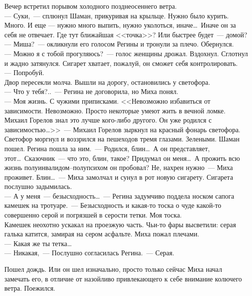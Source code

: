 \noindent Вечер встретил порывом холодного позднеосеннего ветра. \\
--- Суки,~--- сплюнул Шаман, прикуривая на крыльце. Нужно было курить. Много. И 
еще --- нужно много выпить, нужно уколоться, иначе\ldots\ Иначе он за себя не 
отвечает. Где тут ближайшая <<точка>>? Или быстрее будет~--- домой?\\
--- Миша?~--- окликнули его голосом Регины и тронули за плечо. Обернулся. \\
--- Можно я с тобой прогуляюсь?~--- голос женщины дрожал. Вздохнул. Сглотнул и 
жадно затянулся. Сигарет хватает, пожалуй, он сможет себя контролировать. \\
--- Попробуй.\\
Двор пересекли молча. Вышли на дорогу, остановились у светофора.\\
--- Что у тебя?..~--- Регина не договорила, но Миха понял.\\
--- Моя жизнь. С чужими приписками. <<Невозможно избавиться от зависимости. 
Невозможно. Просто некоторые умеют жить в вечной ломке. Михаил Горелов знал это 
лучше кого-либо другого. Он уже родился с зависимостью\ldots>>~--- Михаил 
Горелов зыркнул на красный фонарь светофора. Светофор моргнул и воззрился на пешеходов 
тремя глазами. Зелеными. Шаман пошел. Регина пошла за ним.~--- Родился, 
блин\ldots\ А он представляет, этот\ldots\ Сказочник~--- что это, блин, такое? Придумал он 
меня\ldots\ А прожить всю жизнь полуинвалидом--полупсихом он пробовал? Не, нахрен нужно~--- 
Миха проживет. Блин\ldots~--- Миха замолчал и сунул в рот новую сигарету. Сигарета 
послушно задымилась.\\
--- А у меня~--- безысходность\ldots~--- Регина задумчиво поддела носком сапога 
камешек на тротуаре.~--- Безысходность и какая-то тоска о чуде какой-то совершенно 
серой и погрязшей в серости тетки. Моя тоска.\\
Камешек неохотно ускакал на проезжую часть. Чьи-то фары высветили: серая галька 
катится, замирая на сером асфальте. Миха пожал плечами.\\
--- Какая же ты тетка\ldots\\
--- Никакая,~--- Послушно согласилась Регина.~--- Серая.

Пошел дождь. Или он шел изначально, просто только сейчас Миха начал замечать 
его, в отличие от назойливо привлекающего к себе внимание колючего ветра. 
Поежился.


